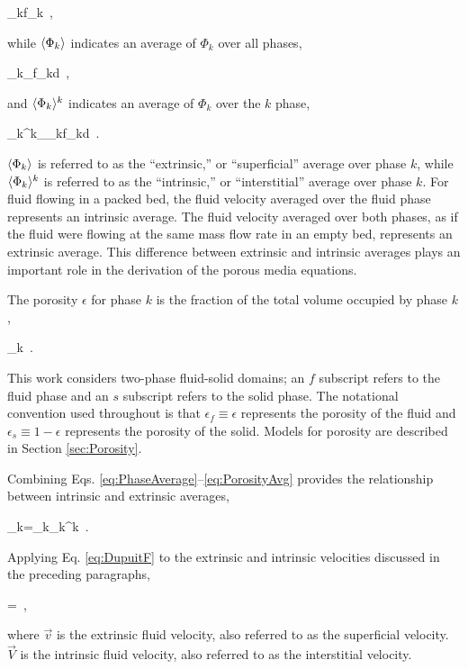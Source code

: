 \beq
\label{eq:KPhaseDef}
\Phi_k\equiv\Phi f_k\ ,
\eeq

\noindent while \(\langle\Phi_k\rangle\) indicates an average of \(\Phi_k\) over all phases,

\beq
\label{eq:PhaseAverage}
\la\Phi_k\ra\equiv{}\int_{\volume}\Phi f_kd\volume\ ,
\eeq

\noindent and \(\langle\Phi_k\rangle^k\) indicates an average of \(\Phi_k\) over the \(k\) phase,

\beq
\label{eq:IntrinsicPhaseAverage}
\la\Phi_k\ra^k\equiv{}\int_{\volume_k}\Phi f_kd\volume\ .
\eeq

\noindent \(\langle\Phi_k\rangle\) is referred to as the ``extrinsic,'' or ``superficial'' average over phase \(k\), while \(\langle\Phi_k\rangle^k\) is referred to as the ``intrinsic,'' or ``interstitial'' average over phase \(k\). For fluid flowing in a packed bed, the fluid velocity averaged over the fluid phase represents an intrinsic average. The fluid velocity averaged over both phases, as if the fluid were flowing at the same mass flow rate in an empty bed, represents an extrinsic average. This difference between extrinsic and intrinsic averages plays an important role in the derivation of the porous media equations. 

The porosity \(\epsilon\) for phase \(k\) is the fraction of the total volume occupied by phase \(k\),

\beq
\label{eq:PorosityAvg}
\epsilon_k\equiv{}\ .
\eeq

\noindent This work considers two-phase fluid-solid domains; an \(f\) subscript refers to the fluid phase and an \(s\) subscript refers to the solid phase. The notational convention used throughout is that \(\epsilon_f\equiv\epsilon\) represents the porosity of the fluid and \(\epsilon_s\equiv1-\epsilon\) represents the porosity of the solid. Models for porosity are described in Section \ref{sec:Porosity}. 

Combining Eqs. \eqref{eq:PhaseAverage}--\eqref{eq:PorosityAvg} provides the relationship between intrinsic and extrinsic averages,

\beq
\label{eq:DupuitF}
\la\Phi_k\ra=\epsilon_k\la\Phi_k\ra^k\ .
\eeq

\noindent Applying Eq. \eqref{eq:DupuitF} to the extrinsic and intrinsic velocities discussed in the preceding paragraphs,

\beq
\label{eq:DupuitForchiemer}
=\epsilon{}\ ,
\eeq

\noindent where \(\vec{v}\) is the extrinsic fluid velocity, also referred to as the superficial velocity. \(\vec{V}\) is the intrinsic fluid velocity, also referred to as the interstitial velocity. 

